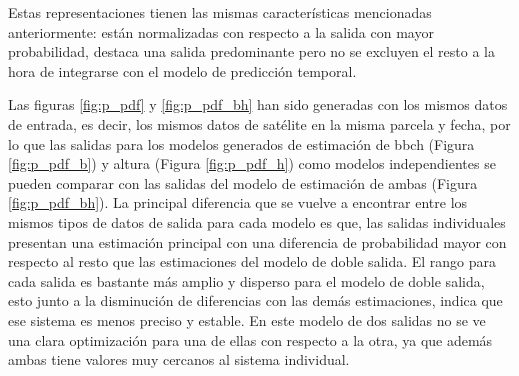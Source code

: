 \par Estas representaciones tienen las mismas características mencionadas anteriormente: están normalizadas con respecto a la salida con mayor probabilidad, destaca una salida predominante pero no se excluyen el resto a la hora de integrarse con el modelo de predicción temporal. 
\\
\par Las figuras \ref{fig:p_pdf} y \ref{fig:p_pdf_bh} han sido generadas con los mismos datos de entrada, es decir, los mismos datos de satélite en la misma parcela y fecha, por lo que las salidas para los modelos generados de estimación de \gls{bbch} (Figura \ref{fig:p_pdf_b}) y altura (Figura \ref{fig:p_pdf_h}) como modelos independientes se pueden comparar con las salidas del modelo de estimación de ambas (Figura \ref{fig:p_pdf_bh}). La principal diferencia que se vuelve a encontrar entre los mismos tipos de datos de salida para cada modelo es que, las salidas individuales presentan una estimación principal con una diferencia de probabilidad mayor con respecto al resto que las estimaciones del modelo de doble salida. El rango para cada salida es bastante más amplio y disperso para el modelo de doble salida, esto junto a la disminución de diferencias con las demás estimaciones, indica que ese sistema es menos preciso y estable. En este modelo de dos salidas no se ve una clara optimización para una de ellas con respecto a la otra,  ya que además ambas tiene valores muy cercanos al sistema individual.

